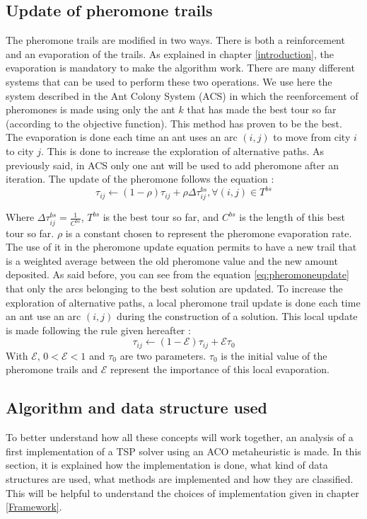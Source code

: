 \subsection{Update of pheromone trails}\label{pheromonetsp}
The pheromone trails are modified in two ways. There is both a reinforcement and an evaporation of the trails. As explained in chapter \ref{introduction}, the evaporation is mandatory to make the algorithm work. There are many different systems that can be used to perform these two operations. We use here the system described in the Ant Colony System (ACS) \cite{dorigo1997acs} in which the reenforcement of pheromones is made using only the ant $k$ that has made the best tour so far (according to the objective function). This method has proven to be the best. The evaporation is done each time an ant uses an arc $(i,j)$ to move from city $i$ to city $j$. This is done to increase the exploration of alternative paths.
As previously said, in ACS only one ant will be used to add pheromone after an iteration. The update of the pheromone follows the equation :
\begin{equation}
	\tau_{ij} \leftarrow (1-\rho)\tau_{ij} + \rho\Delta\tau_{ij}^{bs}, \forall(i,j) \in T^{bs}
	\label{eq:pheromoneupdate}
\end{equation}

Where $\Delta\tau_{ij}^{bs} = \frac{1}{C^{bs}}$, $T^{bs}$ is the best tour so far, and $C^{bs}$ is the length of this best tour so far. $\rho$ is a constant chosen to represent the pheromone evaporation rate. The use of it in the pheromone update equation permits to have a new trail that is a weighted average between the old pheromone value and the new amount deposited. As said before, you can see from the equation \ref{eq:pheromoneupdate} that only the arcs belonging to the best solution are updated.
To increase the exploration of alternative paths, a local pheromone trail update is done each time an ant use an arc $(i,j)$ during the construction of a solution. This local update is made following the rule given hereafter :
\begin{equation}
	\tau_{ij} \leftarrow (1 - \mathcal{E})\tau_{ij} + \mathcal{E}\tau_0
	\label{eq:localpheromone}
\end{equation}
With $\mathcal{E}$, $0<\mathcal{E}<1$ and $\tau_0$ are two parameters. $\tau_0$ is the initial value of the pheromone trails and $\mathcal{E}$ represent the importance of this local evaporation.


\subsection{Algorithm and data structure used}
To better understand how all these concepts will work together, an analysis of a first implementation of a TSP solver using an ACO metaheuristic is made. In this section, it is explained how the implementation is done, what kind of data structures are used, what methods are implemented and how they are classified. This will be helpful to understand the choices of implementation given in chapter \ref{Framework}.

